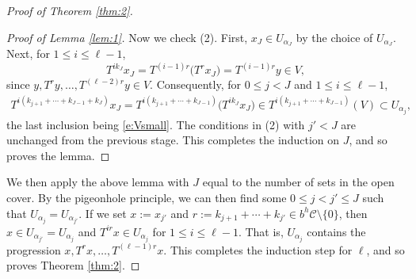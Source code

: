 \begin{proof}[Proof of Theorem \ref{thm:2}]
\begin{proof}[Proof of Lemma \ref{lem:1}]
Now we check (2).  First, $x_J \in U_{\alpha_J}$ by the choice of $U_{\alpha _J}$.  Next, for $1 \leq i \leq \ell -1$,  
\begin{equation}
T^{i k_J}x_J=T^{(i-1)r}\bigl( T ^{r} x_J\bigr) = T ^{(i-1)r}y \in V ,
\end{equation}
since $y, T^{r}y, \ldots, T^{(\ell-2)r}y\in V$.  Consequently, for $0\leq j<J$ and $1\leq i\leq \ell-1$, 
\begin{align*}
    T^{i(k_{j+1}+\cdots +k_{J-1}+k_{J})}x_J = T^{i(k_{j+1}+\cdots +k_{J-1})}\bigl( T^{ik_J}x_J \bigr) 
    \in T^{i(k_{j+1}+\cdots +k_{J-1})}(V) \subset U_{\alpha _j} ,
\end{align*} 
the last inclusion being \eqref{e:Vsmall}.  The conditions in (2) with $j'<J$ are unchanged from the previous stage.  
This completes the induction on $J$, and so proves the lemma. 
\end{proof}

We then apply the above lemma with $J$ equal to the number of sets in the open cover. By the pigeonhole principle, we can then find some $0\leq j< j'\leq J$ such that $U_{\alpha_j}=U_{\alpha_{j'}}$. If we set $x:=x_{j'}$ and $r:=k_{j+1}+\cdots +k_{j'} \in b ^{h} \mathcal C \setminus \{0\}$, then  $x \in U_{\alpha_{j'}} = U_{\alpha _j}$ and $T ^{ir}x \in U_{\alpha _j}$ for $1 \leq i \leq \ell -1$.  That is, $U_{\alpha_j}$ contains the progression $x, T^{r}x , \ldots, T^{(\ell-1)r}x$. This completes the induction step for $\ell$, and so proves Theorem \ref{thm:2}. 
\end{proof}
